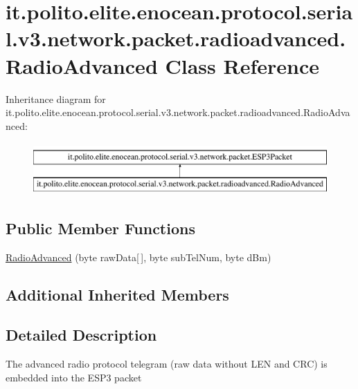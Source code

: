 \hypertarget{classit_1_1polito_1_1elite_1_1enocean_1_1protocol_1_1serial_1_1v3_1_1network_1_1packet_1_1radioadvanced_1_1_radio_advanced}{}\section{it.\+polito.\+elite.\+enocean.\+protocol.\+serial.\+v3.\+network.\+packet.\+radioadvanced.\+Radio\+Advanced Class Reference}
\label{classit_1_1polito_1_1elite_1_1enocean_1_1protocol_1_1serial_1_1v3_1_1network_1_1packet_1_1radioadvanced_1_1_radio_advanced}
Inheritance diagram for it.\+polito.\+elite.\+enocean.\+protocol.\+serial.\+v3.\+network.\+packet.\+radioadvanced.\+Radio\+Advanced\+:\begin{figure}[H]
\begin{center}
\leavevmode
\includegraphics[height=2.000000cm]{classit_1_1polito_1_1elite_1_1enocean_1_1protocol_1_1serial_1_1v3_1_1network_1_1packet_1_1radioadvanced_1_1_radio_advanced}
\end{center}
\end{figure}
\subsection*{Public Member Functions}
\begin{DoxyCompactItemize}
\item 
\hyperlink{classit_1_1polito_1_1elite_1_1enocean_1_1protocol_1_1serial_1_1v3_1_1network_1_1packet_1_1radioadvanced_1_1_radio_advanced_a3b14ce73b1c274e99f738383c2462112}{Radio\+Advanced} (byte raw\+Data\mbox{[}$\,$\mbox{]}, byte sub\+Tel\+Num, byte d\+Bm)
\end{DoxyCompactItemize}
\subsection*{Additional Inherited Members}


\subsection{Detailed Description}
The advanced radio protocol telegram (raw data without L\+EN and C\+RC) is embedded into the E\+S\+P3 packet

